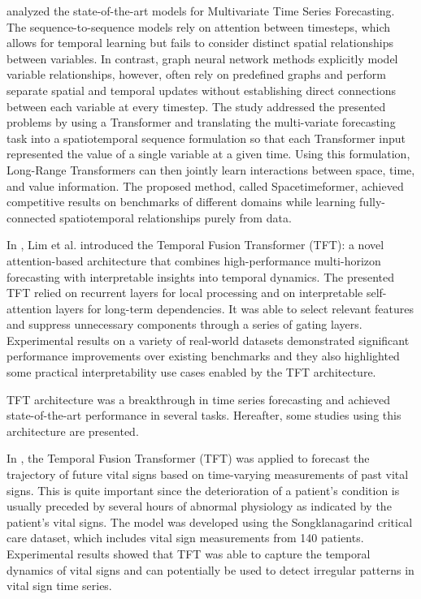 \cite{Grigsby2021} analyzed the state-of-the-art models for Multivariate Time Series Forecasting.
The sequence-to-sequence models rely on attention between timesteps, which allows for temporal learning but fails to consider distinct spatial relationships between variables.
In contrast, graph neural network methods explicitly model variable relationships, however, often rely on predefined graphs and perform separate spatial and temporal updates without establishing direct connections between each variable at every timestep.
The study addressed the presented problems by using a Transformer and translating the multi-variate forecasting task into a spatiotemporal sequence formulation so that each Transformer input represented the value of a single variable at a given time.
Using this formulation, Long-Range Transformers can then jointly learn interactions between space, time, and value information.
The proposed method, called Spacetimeformer, achieved competitive results on benchmarks of different domains while learning fully-connected spatiotemporal relationships purely from data.

In \cite{LIM20211748}, Lim et al. introduced the Temporal Fusion Transformer (TFT): a novel attention-based architecture that combines high-performance multi-horizon forecasting with interpretable insights into temporal dynamics.
The presented TFT relied on recurrent layers for local processing and on interpretable self-attention layers for long-term dependencies.
It was able to select relevant features and suppress unnecessary components through a series of gating layers.
Experimental results on a variety of real-world datasets demonstrated significant performance improvements over existing benchmarks and they also highlighted some practical interpretability use cases enabled by the TFT architecture.

TFT architecture was a breakthrough in time series forecasting and achieved state-of-the-art performance in several tasks.
Hereafter, some studies using this architecture are presented.

In \cite{9745215}, the Temporal Fusion Transformer (TFT) was applied to forecast the trajectory of future vital signs based on time-varying measurements of past vital signs.
This is quite important since the deterioration of a patient’s condition is usually preceded by several hours of abnormal physiology as indicated by the patient’s vital signs.
The model was developed using the Songklanagarind critical care dataset, which includes vital sign measurements from 140 patients.
Experimental results showed that TFT was able to capture the temporal dynamics of vital signs and can potentially be used to detect irregular patterns in vital sign time series.

